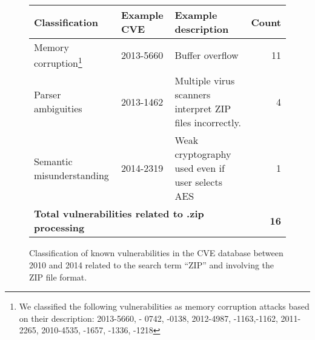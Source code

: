 \begin{figure*}
\centering
\begin{tabular}{lllr}
\toprule
 \bf Classification & \bf Example CVE & \bf Example description & \bf Count\\
\midrule
  Memory corruption\footnote{We classified the following vulnerabilities as memory corruption
    attacks based on their description: 2013-5660, - 0742, -0138, 2012-4987, -1163,-1162, 2011-2265,
    2010-4535, -1657, -1336, -1218} & 2013-5660 & Buffer overflow & 11\\
  Parser ambiguities & 2013-1462 & Multiple virus scanners interpret ZIP files incorrectly.& 4\\
  Semantic misunderstanding & 2014-2319 & Weak cryptography used even if user selects AES & 1\\
  \multicolumn{3}{l}{\bf Total vulnerabilities related to .zip processing }& \bf 16  \\
\bottomrule
  
\end{tabular}
\caption{Classification of known vulnerabilities in the CVE database
between 2010 and 2014 related to the search term ``ZIP'' and involving
the ZIP file format.}
\label{fig:motivation} 
\end{figure*}
